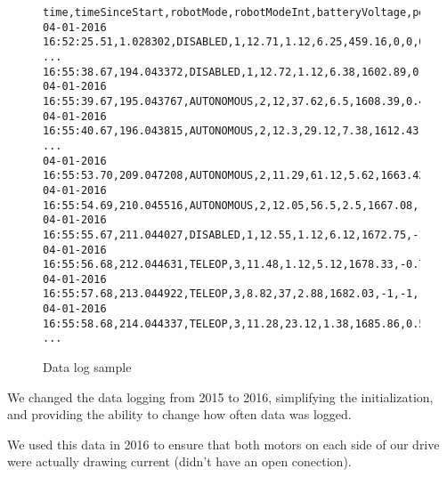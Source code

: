 \documentclass[]{article}
\begin{document}
\begin{itemize}[topsep=0pt]
\begin{figure}[h]
\begin{mdframed}
\begin{lstlisting}[basicstyle=\ttfamily\tiny]
time,timeSinceStart,robotMode,robotModeInt,batteryVoltage,pdp.totalCurrent,pdp.totalPower,pdp.totalEnergy,drive.lf.power,drive.lr.power,drive.rf.power,drive.rr.power,drive.lf.current,drive.lr.current,drive.rf.current,drive.rr.current,armTalon.error,armTalon.current,armTalon.voltage,armTalon.mode,shooter.2.v,shooter.2.a,shooter.3.v,shooter.3.a,drive.automaticHeading,drive.angle,drive.pitchangle,drive.roleangle
04-01-2016 16:52:25.51,1.028302,DISABLED,1,12.71,1.12,6.25,459.16,0,0,0,0,0,0,1.12,0,0,0,0,PercentVbus,0,0,0,0,0,1.42,-0.88,-1.46
...
16:55:38.67,194.043372,DISABLED,1,12.72,1.12,6.38,1602.89,0,0,0,0,0,0,1.12,0,0,0,0,PercentVbus,0,0,0,0,0,0.77,-0.82,-1.51
04-01-2016 16:55:39.67,195.043767,AUTONOMOUS,2,12,37.62,6.5,1608.39,0.42,0.42,-0.42,-0.42,8.38,8.38,8.38,8.25,281,0,0.81,Position,0,0,0,0,0,0.2,-0.72,1.41
04-01-2016 16:55:40.67,196.043815,AUTONOMOUS,2,12.3,29.12,7.38,1612.43,-1,-1,-1,-1,3.38,2.88,3,2.25,4086,15.25,11.13,Position,0,0,0,0,0,2.14,-0.88,0.35
...
04-01-2016 16:55:53.70,209.047208,AUTONOMOUS,2,11.29,61.12,5.62,1663.42,0.64,0.64,-0.22,-0.22,19.75,19.62,4.38,4.62,174,0,0.47,Position,8.35,5.5,8.33,6.38,2,358.85,-0.7,6.84
04-01-2016 16:55:54.69,210.045516,AUTONOMOUS,2,12.05,56.5,2.5,1667.08,-1,-1,-1,-1,20.5,20.88,1.25,1,174,0,0.47,Position,8.24,6.12,8.22,7.12,2,358.93,-0.72,7.22
04-01-2016 16:55:55.67,211.044027,DISABLED,1,12.55,1.12,6.12,1672.75,-1,-1,-1,-1,0,0,1.12,0,174,0,0,Position,0,0,0,0,2,357.84,-1.12,6.38
04-01-2016 16:55:56.68,212.044631,TELEOP,3,11.48,1.12,5.12,1678.33,-0.75,-0.75,0.75,0.75,0,0,3.25,2.5,392,0,1.18,Position,0,0,0,0,0,0,-1.78,5.78
04-01-2016 16:55:57.68,213.044922,TELEOP,3,8.82,37,2.88,1682.03,-1,-1,-1,-1,14.88,15.38,2.62,4.12,256,0,0.74,Position,0,0,0,0,0,351.3,-1.87,-6.37
04-01-2016 16:55:58.68,214.044337,TELEOP,3,11.28,23.12,1.38,1685.86,0.57,0.57,-0.57,-0.57,24.38,24.75,35.25,2.88,3638,5.12,8.49,Position,0,0,0,0,0,150.14,-2.07,-4.13
...
\end{lstlisting}
\caption{Data log sample}
\label{fig:datalog}
\end{mdframed}
\end{figure}

We changed the data logging from 2015 to 2016, simplifying the initialization, and providing the ability to change how often data was logged.

We used this data in 2016 to ensure that both motors on each side of our drive were actually drawing current (didn't have an open conection).


\end{itemize}
\end{document}
